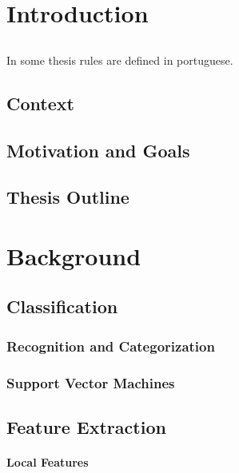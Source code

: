 \chapter{Introduction}
\section*{}
In \cite{kn:Mat93} some thesis rules are defined in portuguese.

\section{Context}
\section{Motivation and Goals}
\section{Thesis Outline}

\chapter{Background}
\section*{}

\section{Classification}
\subsection{Recognition and Categorization}
\subsection{Support Vector Machines}

\section{Feature Extraction}
\subsubsection{Local Features}
